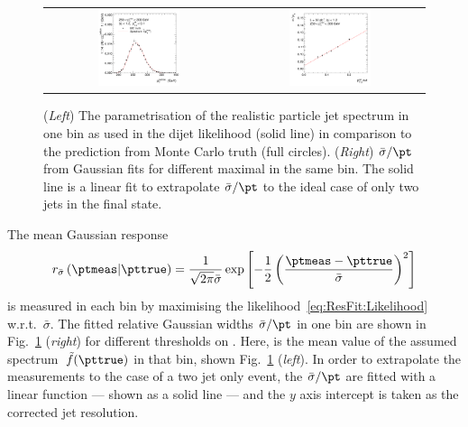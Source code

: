\begin{figure}[ht]
  \centering
  \begin{tabular}{cc}
    \includegraphics[width=0.45\textwidth]{figures/ResFit_Spring10QCDFlat_Gauss_Eta0_Spectrum_PtBin6} &
    \includegraphics[width=0.45\textwidth]{figures/ResFit_Spring10QCDFlat_Gauss_Eta0_ExtrapolatedPar0_PtBin6}
  \end{tabular}
\caption{(\textit{Left}) The parametrisation of the realistic particle jet \pt spectrum in one \pt bin as used in the dijet likelihood (solid line) in comparison to the prediction from Monte Carlo truth (full circles). 
  (\textit{Right}) $\bar{\sigma}/\pt$ from Gaussian fits for different maximal \ptrel in the same \pt bin.
  The solid line is a linear fit to extrapolate $\bar{\sigma}/\pt$ to the ideal case of only two jets in the
  final state.}
\label{fig:ResFit:QCDMC:Extrapolation:Gauss:ExBin:SpectrumAndExtrapolation}
\end{figure}

The mean Gaussian response
\begin{equation*}
  r_{\bar{\sigma}}\left(\ptmeas|\pttrue\right) = 
  \frac{1}{\sqrt{2\pi}\bar{\sigma}}\exp\left[-\frac{1}{2}\left(\frac{\ptmeas - \pttrue}{\bar{\sigma}}\right)^{2}\right]
\end{equation*}
is measured in each bin by maximising the likelihood~\eqref{eq:ResFit:Likelihood} w.r.t.~$\bar{\sigma}$.
The fitted relative Gaussian widths $\bar{\sigma}/\pt$ in one \pt bin are shown in Fig.~\ref{fig:ResFit:QCDMC:Extrapolation:Gauss:ExBin:SpectrumAndExtrapolation} (\textit{right}) for different thresholds on \ptrel.
Here, \pt is the mean value of the assumed spectrum~$\tilde{f}(\pttrue)$ in that bin, shown Fig.~\ref{fig:ResFit:QCDMC:Extrapolation:Gauss:ExBin:SpectrumAndExtrapolation} (\textit{left}).
In order to extrapolate the measurements to the case of a two jet only event, the $\bar{\sigma}/\pt$ are fitted with a linear function --- shown as a solid line --- and the $y$ axis intercept is taken as the corrected jet \pt resolution.

